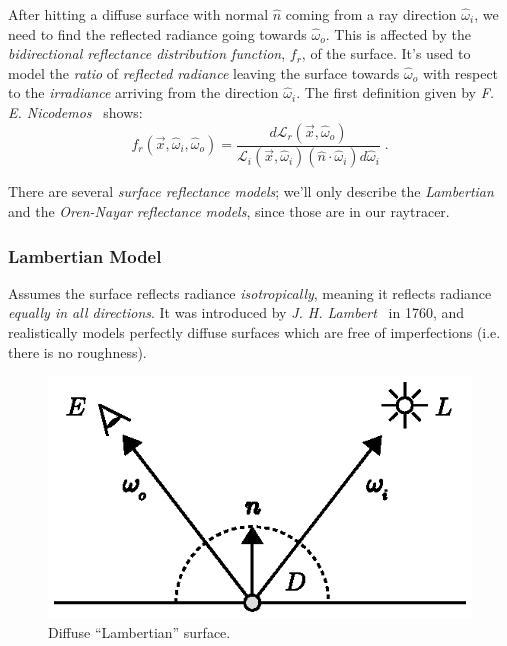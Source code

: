 \documentclass[a4paper, twocolumn]{article}
\begin{document}
            After hitting a diffuse surface with normal \(\hat{n}\) coming from a ray direction \(\hat{\omega}_i\), we need to find the reflected radiance going towards \(\hat{\omega}_o\). This is affected by the \emph{bidirectional reflectance distribution function}, \(f_r\), of the surface. It's used to model the \emph{ratio} of \emph{reflected radiance} leaving the surface towards \(\hat{\omega}_o\) with respect to the \emph{irradiance} arriving from the direction \(\hat{\omega}_i\). The first definition given by \emph{F. E. Nicodemos}~\cite{nicodemus1965directional} shows: \[f_r(\vec{x}, \hat{\omega}_i, \hat{\omega}_o) = \frac{d \mathcal{L}_{r}(\vec{x}, \hat{\omega}_o)}{\mathcal{L}_i(\vec{x}, \hat{\omega}_i)(\hat{n} \cdot \hat{\omega}_i)d\hat{\omega}_i}\; .\]

            There are several \emph{surface reflectance models}; we'll only describe the \emph{Lambertian} and the \emph{Oren-Nayar} \emph{reflectance models}, since those are in our raytracer.

            \subsubsection{Lambertian Model} \label{sec:lambertian_model}

                Assumes the surface reflects radiance \emph{isotropically}, meaning it reflects radiance \emph{equally in all directions}. It was introduced by \emph{J. H. Lambert}~\cite{lambert1760photometria} in 1760, and realistically models perfectly diffuse surfaces which are free of imperfections (i.e. there is no roughness).

                \begin{figure}[ht]
                    \centering
                    \includegraphics[width=0.8\linewidth]{share/lambertian_model.eps}
                    \caption{Diffuse ``Lambertian'' surface.}
                    \label{fig:lambertian_model}
                \end{figure}
\end{document}
